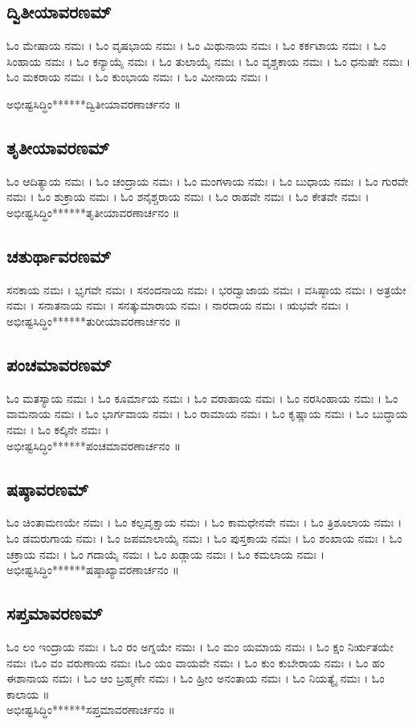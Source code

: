 \subsection{ದ್ವಿತೀಯಾವರಣಮ್}
ಓಂ ಮೇಷಾಯ ನಮಃ ।
ಓಂ ವೃಷಭಾಯ ನಮಃ ।
ಓಂ ಮಿಥುನಾಯ ನಮಃ ।
ಓಂ ಕರ್ಕಟಾಯ ನಮಃ ।
ಓಂ ಸಿಂಹಾಯ ನಮಃ ।
ಓಂ ಕನ್ಯಾಯೈ ನಮಃ ।
ಓಂ ತುಲಾಯೈ ನಮಃ ।
ಓಂ ವೃಶ್ಚಕಾಯ ನಮಃ ।
ಓಂ ಧನುಷೇ ನಮಃ ।
ಓಂ ಮಕರಾಯ ನಮಃ ।
ಓಂ ಕುಂಭಾಯ ನಮಃ ।
ಓಂ ಮೀನಾಯ ನಮಃ ।

ಅಭೀಷ್ಟಸಿದ್ಧಿಂ******ದ್ವಿತೀಯಾವರಣಾರ್ಚನಂ ॥
\subsection{ತೃತೀಯಾವರಣಮ್}
ಓಂ ಆದಿತ್ಯಾಯ ನಮಃ ।
ಓಂ ಚಂದ್ರಾಯ ನಮಃ ।
ಓಂ ಮಂಗಳಾಯ ನಮಃ ।
ಓಂ ಬುಧಾಯ ನಮಃ ।
ಓಂ ಗುರವೇ ನಮಃ ।
ಓಂ ಶುಕ್ರಾಯ ನಮಃ ।
ಓಂ ಶನೈಶ್ಚರಾಯ ನಮಃ ।
ಓಂ ರಾಹವೇ ನಮಃ ।
ಓಂ ಕೇತವೇ ನಮಃ ।\\
ಅಭೀಷ್ಟಸಿದ್ಧಿಂ******ತೃತೀಯಾವರಣಾರ್ಚನಂ ॥
\newpage
\subsection{ಚತುರ್ಥಾವರಣಮ್}
ಸನಕಾಯ ನಮಃ ।
ಭೃಗವೇ ನಮಃ ।
ಸನಂದನಾಯ ನಮಃ ।
ಭರದ್ವಾಜಾಯ ನಮಃ ।
ವಸಿಷ್ಠಾಯ ನಮಃ ।
ಅತ್ರಯೇ ನಮಃ ।
ಸನಾತನಾಯ ನಮಃ ।
ಸನತ್ಕುಮಾರಾಯ ನಮಃ ।
ನಾರದಾಯ ನಮಃ ।
ಋಭವೇ ನಮಃ ।\\
ಅಭೀಷ್ಟಸಿದ್ಧಿಂ******ತುರೀಯಾವರಣಾರ್ಚನಂ ॥
\subsection{ಪಂಚಮಾವರಣಮ್}
ಓಂ ಮತಸ್ಯಾಯ ನಮಃ ।
ಓಂ ಕೂರ್ಮಾಯ ನಮಃ ।
ಓಂ ವರಾಹಾಯ ನಮಃ ।
ಓಂ ನರಸಿಂಹಾಯ ನಮಃ ।
ಓಂ ವಾಮನಾಯ ನಮಃ ।
ಓಂ ಭಾರ್ಗವಾಯ ನಮಃ ।
ಓಂ ರಾಮಾಯ ನಮಃ ।
ಓಂ ಕೃಷ್ಣಾಯ ನಮಃ ।
ಓಂ ಬುದ್ಧಾಯ ನಮಃ ।
ಓಂ ಕಲ್ಕಿನೇ ನಮಃ ।\\
ಅಭೀಷ್ಟಸಿದ್ಧಿಂ******ಪಂಚಮಾವರಣಾರ್ಚನಂ ॥
\subsection{ಷಷ್ಠಾವರಣಮ್}
ಓಂ ಚಿಂತಾಮಣಯೇ ನಮಃ ।
ಓಂ ಕಲ್ಪವೃಕ್ಷಾಯ ನಮಃ ।
ಓಂ ಕಾಮಧೇನವೇ ನಮಃ ।
ಓಂ ತ್ರಿಶೂಲಾಯ ನಮಃ ।
ಓಂ ಡಮರುಗಾಯ ನಮಃ ।
ಓಂ ಜಪಮಾಲಾಯೈ ನಮಃ ।
ಓಂ ಪುಸ್ತಕಾಯ ನಮಃ ।
ಓಂ ಶಂಖಾಯ ನಮಃ ।
ಓಂ ಚಕ್ರಾಯ ನಮಃ ।
ಓಂ ಗದಾಯೈ ನಮಃ ।
ಓಂ ಖಡ್ಗಾಯ ನಮಃ ।
ಓಂ ಕಮಲಾಯ ನಮಃ ।\\
ಅಭೀಷ್ಟಸಿದ್ಧಿಂ******ಷಷ್ಠಾಖ್ಯಾವರಣಾರ್ಚನಂ ॥
\subsection{ಸಪ್ತಮಾವರಣಮ್}
ಓಂ ಲಂ ಇಂದ್ರಾಯ ನಮಃ । ಓಂ ರಂ ಅಗ್ನಯೇ ನಮಃ । ಓಂ ಮಂ ಯಮಾಯ ನಮಃ । ಓಂ ಕ್ಷಂ ನಿರ್ಋತಯೇ ನಮಃ ।ಓಂ ವಂ ವರುಣಾಯ ನಮಃ ।ಓಂ ಯಂ ವಾಯವೇ ನಮಃ । ಓಂ ಕುಂ ಕುಬೇರಾಯ ನಮಃ । ಓಂ ಹಂ ಈಶಾನಾಯ ನಮಃ । ಓಂ ಆಂ ಬ್ರಹ್ಮಣೇ ನಮಃ । ಓಂ ಹ್ರೀಂ ಅನಂತಾಯ ನಮಃ । ಓಂ ನಿಯತ್ಯೈ ನಮಃ । ಓಂ ಕಾಲಾಯ ॥\\
ಅಭೀಷ್ಟಸಿದ್ಧಿಂ******ಸಪ್ತಮಾವರಣಾರ್ಚನಂ ॥
